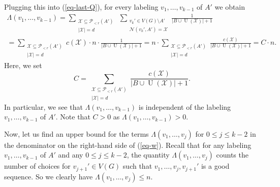 Plugging this into (\ref{eq-last-Q}), for every labeling $v_1,\dots,v_{k-1}$ of $A'$ we obtain
\begin{multline}\label{eq-Q-C}
\Lambda(v_1,\dots,v_{k-1})=\sum_{\substack{\mathcal{X}\subseteq \mathcal{P}\!_{<r}(A')\\ \vert \mathcal{X}\vert=d}}\ \sum_{\substack{v_{k}'\in V(G)\setminus A'\\ \mathcal{N}(v_k',A')=\mathcal{X}}}\frac{1}{\vert B\cup \operatorname{U}(\mathcal{X})\vert +1}\\
=\sum_{\substack{\mathcal{X}\subseteq \mathcal{P}\!_{<r}(A')\\ \vert \mathcal{X}\vert=d}}c(\mathcal{X})\cdot n\cdot \frac{1}{\vert B\cup \operatorname{U}(\mathcal{X})\vert +1}=n\cdot \sum_{\substack{\mathcal{X}\subseteq \mathcal{P}\!_{<r}(A')\\ \vert \mathcal{X}\vert=d}}\frac{c(\mathcal{X})}{\vert B\cup \operatorname{U}(\mathcal{X})\vert +1}=C\cdot n.
\end{multline}
Here, we set
\[C=\sum_{\substack{\mathcal{X}\subseteq \mathcal{P}\!_{<r}(A')\\ \vert \mathcal{X}\vert=d}}\frac{c(\mathcal{X})}{\vert B\cup \operatorname{U}(\mathcal{X})\vert +1}.\]
In particular, we see that $\Lambda(v_1,\dots,v_{k-1})$ is independent of the labeling $v_1,\dots,v_{k-1}$ of $A'$. Note that $C>0$ as $\Lambda(v_1,\dots,v_{k-1})>0$.

Now, let us find an upper bound for the terms $\Lambda(v_1,\dots,v_{j})$ for $0\leq j\leq k-2$ in the denominator on the right-hand side of (\ref{eq-w}). Recall that for any labeling $v_1,\dots,v_{k-1}$ of $A'$ and any $0\leq j\leq k-2$, the quantity  $\Lambda(v_1,\dots,v_{j})$ counts the number of choices for $v_{j+1}'\in V(G)$ such that $v_1,\dots,v_j,v_{j+1}'$ is a good sequence. So we clearly have $\Lambda(v_1,\dots,v_{j})\leq n$.

